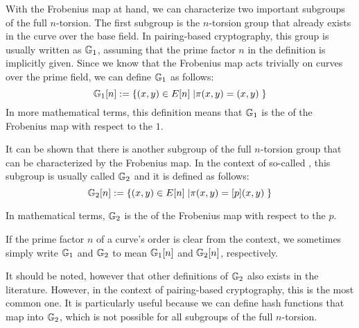 With the Frobenius map at hand, we can characterize two important subgroups of the full $n$-torsion. The first subgroup is the $n$-torsion group that already exists in the curve over the base field. In pairing-based cryptography, this group is usually written as $\mathbb{G}_1$, assuming that the prime factor $n$ in the definition is implicitly given. Since we know that the Frobenius map acts trivially on curves over the prime field, we can define $\mathbb{G}_1$ as follows:
\begin{equation}
\mathbb{G}_1[n] := \{(x,y)\in E[n]\;| \pi(x,y) = (x,y)\;\}
\end{equation}
In more mathematical terms, this definition means that $\mathbb{G}_1$ is the  of the Frobenius map with respect to the  $1$.

It can be shown that there is another subgroup of the full $n$-torsion group that can be characterized by the Frobenius map. In the context of so-called , this subgroup is usually called $\mathbb{G}_2$ and it is defined as follows:
\begin{equation}
\mathbb{G}_2[n] := \{(x,y)\in E[n]\;| \pi(x,y) = [p](x,y)\;\}
\end{equation}

In mathematical terms, $\mathbb{G}_2$ is the  of the Frobenius map with respect to the  $p$.

\begin{notation}
If the prime factor $n$ of a curve's order is clear from the context, we sometimes simply write $\mathbb{G}_1$ and $\mathbb{G}_2$ to mean $\mathbb{G}_1[n]$ and $\mathbb{G}_2[n]$, respectively.
\end{notation}

It should be noted, however that other definitions of $\mathbb{G}_2$ also exists in the literature. However, in the context of pairing-based cryptography, this is the most common one. It is particularly useful because we can define hash functions that map into $\mathbb{G}_2$, which is not possible for all subgroups of the full $n$-torsion.

